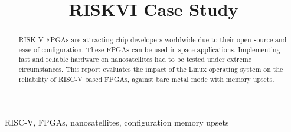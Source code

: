 \documentclass[conference]{IEEEtran}
\begin{document}
\title{RISKVI Case Study\\}
\author{
}
\maketitle

\begin{abstract}
RISK-V FPGAs are attracting chip developers worldwide due to their open source and 
ease of configuration. These FPGAs can be used in space applications. Implementing fast and reliable 
hardware on nanosatellites had to be tested under extreme circumstances. This report evaluates the
impact of the Linux operating system on the reliability of RISC-V based FPGAs, against bare metal mode 
with memory upsets. 
\end{abstract}
\begin{IEEEkeywords}
RISC-V, FPGAs, nanosatellites, configuration memory upsets
\end{IEEEkeywords}

\end{document}

